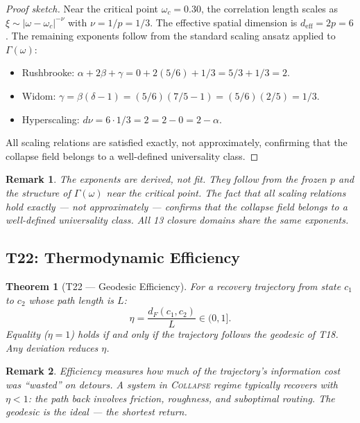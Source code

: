 \documentclass[
  aps,
  prd,
  preprint,
  superscriptaddress,
  nofootinbib,
  floatfix,
  longbibliography
]{revtex4-2}
\newtheorem{theorem}{Theorem}
\newtheorem{remark}{Remark}
\newcommand{\Gam}{\Gamma}
\newcommand{\beq}{\begin{equation}}
\newcommand{\eeq}{\end{equation}}
\newcommand{\regime}[1]{\textnormal{\textsc{#1}}}
\newcommand{\Drft}{\omega}
\newcommand{\dFisher}{d_{\!F}}
\begin{document}
\begin{proof}[Proof sketch]
Near the critical point $\Drft_c = 0.30$, the
correlation length scales as
$\xi \sim |\Drft - \Drft_c|^{-\nu}$ with
$\nu = 1/p = 1/3$.
The effective spatial dimension is
$d_{\mathrm{eff}} = 2p = 6$.
The remaining exponents follow from the standard
scaling ansatz applied to $\Gam(\Drft)$:
\begin{itemize}[nosep,leftmargin=*]
  \item Rushbrooke:
    $\alpha + 2\beta + \gamma
    = 0 + 2(5/6) + 1/3
    = 5/3 + 1/3 = 2$. \checkmark
  \item Widom:
    $\gamma = \beta(\delta - 1)
    = (5/6)(7/5 - 1)
    = (5/6)(2/5) = 1/3$. \checkmark
  \item Hyperscaling:
    $d\nu = 6 \cdot 1/3 = 2 = 2 - 0 = 2 - \alpha$.
    \checkmark
\end{itemize}
All scaling relations are satisfied exactly, not
approximately, confirming that the collapse field
belongs to a well-defined universality class.
\end{proof}

\begin{remark}
The exponents are derived, not fit.
They follow from the frozen $p$ and the structure of
$\Gam(\Drft)$ near the critical point.
The fact that all scaling relations hold exactly —
not approximately — confirms that the collapse field
belongs to a well-defined universality class.
All 13 closure domains share the same exponents.
\end{remark}

\subsection{T22: Thermodynamic Efficiency}

\begin{theorem}[T22 — Geodesic Efficiency]\label{thm:T22}
For a recovery trajectory from state $c_1$ to $c_2$
whose path length is $L$:
\beq
  \eta = \frac{\dFisher(c_1, c_2)}{L} \in (0, 1].
\eeq
Equality ($\eta = 1$) holds if and only if the trajectory
follows the geodesic of T18. Any deviation reduces $\eta$.
\end{theorem}

\begin{remark}
Efficiency measures how much of the trajectory's
information cost was ``wasted'' on detours.
A system in \regime{Collapse} regime typically recovers
with $\eta < 1$: the path back involves friction,
roughness, and suboptimal routing.
The geodesic is the ideal — the shortest return.
\end{remark}
\end{document}
